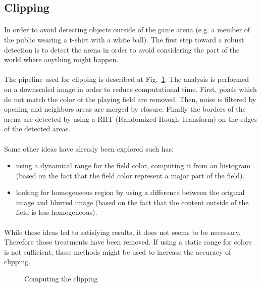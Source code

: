 \documentclass[a4paper,12pt]{article}
\begin{document}
\subsection{Clipping}
\paragraph{}
In order to avoid detecting objects outside of the game arena (e.g. a member
of the public wearing a t-shirt with a white ball). The first step toward a
robust detection is to detect the arena in order to avoid considering the
part of the world where anything might happen.
\paragraph{}
The pipeline used for clipping is described at Fig.~\ref{fig:clipping}. The
analysis is performed on a downscaled image in order to reduce computational
time. First, pixels which do not match the color of the playing field are
removed. Then, noise is filtered by opening and neighbors areas are
merged by closure. Finally the borders of the arena are detected by using
a RHT (Randomized Hough Transform) on the edges of the detected areas.
\paragraph{}
Some other ideas have already been explored such has:
\begin{itemize}
\item using a dynamical range for the field color, computing it from an
  histogram (based on the fact that the field color represent a major
  part of the field).
\item looking for homogeneous region by using a difference between the original
  image and blurred image (based on the fact that the content outside of the
  field is less homogeneous).
\end{itemize}
\paragraph{}
While these ideas led to satisfying results, it does not seems to be necessary.
Therefore those treatments have been removed. If using a static range for colors
is not sufficient, those methods might be used to increase the accuracy of
clipping.


\begin{figure}
  \centering
  \caption{\label{fig:clipping}Computing the clipping}
  
\end{figure}
\end{document}

